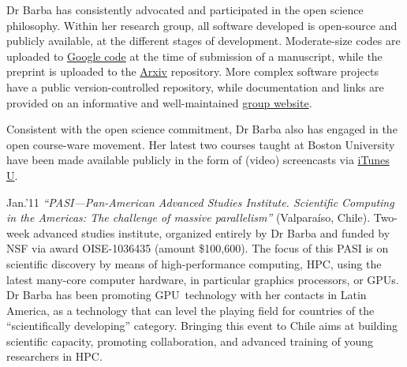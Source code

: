 \documentclass{proposalnsf}
\newcommand{\gpu}{\textsc{GPU}}
\newlength{\up}
\begin{document}
\begin{list}{ }{\setlength{\leftmargin}{2.5em}}


	\item[]  Dr Barba has consistently advocated and participated in the open science philosophy.  Within her research group, all software developed is open-source and publicly available, at the different stages of development.  Moderate-size codes are uploaded to \href{http://code.google.com/u/lorena.barba/}{Google code} at the time of submission of a manuscript, while the preprint is uploaded to the \href{http://arxiv.org/find/cs/1/au:+Barba_L/0/1/0/all/0/1}{Arxiv} repository.  More complex software projects have a public version-controlled repository, while documentation and links are provided on an informative and well-maintained \href{http://barbagroup.bu.edu/}{group website}.

	Consistent with the open science commitment, Dr Barba also has engaged in the open course-ware movement.  Her latest two courses taught at Boston University have been made available publicly in the form of (video) screencasts via \href{http://deimos3.apple.com/WebObjects/Core.woa/Browse/bu.edu.3295784150}{iTunes U}.
	
	\item[Jan.'11] \emph{``PASI---Pan-American Advanced Studies Institute.  Scientific Computing in the Americas: The challenge of massive parallelism''} (Valpara\'iso, Chile).  Two-week advanced studies institute, organized entirely by Dr Barba and funded by NSF via award OISE-1036435 (amount \$100,600).  The focus of this PASI is on scientific discovery by means of high-performance computing, HPC,  using the latest many-core computer hardware, in particular graphics processors, or \gpu s.  Dr Barba has been promoting \gpu\ technology with her contacts in Latin America, as a technology that can level the playing field for countries of the ``scientifically developing'' category.  Bringing this event to Chile aims at building scientific capacity, promoting collaboration, and advanced training of young researchers in HPC. 
	

\end{list}
\end{document}
